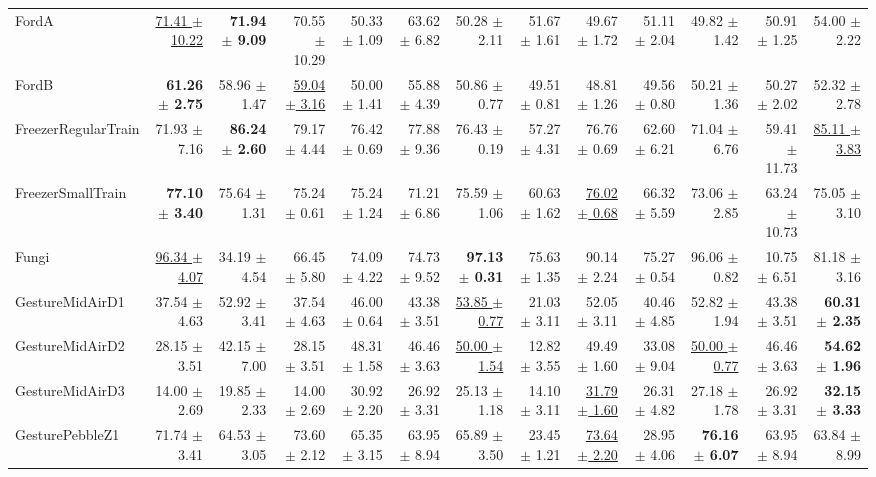 \begin{landscape}
\begin{longtable}{lrrrrrrrrrrrr}
FordA & \underline{71.41 $\pm$ 10.22} & \textbf{71.94 $\pm$ 9.09} & 70.55 $\pm$ 10.29 & 50.33 $\pm$ 1.09 & 63.62 $\pm$ 6.82 & 50.28 $\pm$ 2.11 & 51.67 $\pm$ 1.61 & 49.67 $\pm$ 1.72 & 51.11 $\pm$ 2.04 & 49.82 $\pm$ 1.42 & 50.91 $\pm$ 1.25 & 54.00 $\pm$ 2.22 \\
FordB & \textbf{61.26 $\pm$ 2.75} & 58.96 $\pm$ 1.47 & \underline{59.04 $\pm$ 3.16} & 50.00 $\pm$ 1.41 & 55.88 $\pm$ 4.39 & 50.86 $\pm$ 0.77 & 49.51 $\pm$ 0.81 & 48.81 $\pm$ 1.26 & 49.56 $\pm$ 0.80 & 50.21 $\pm$ 1.36 & 50.27 $\pm$ 2.02 & 52.32 $\pm$ 2.78 \\
FreezerRegularTrain & 71.93 $\pm$ 7.16 & \textbf{86.24 $\pm$ 2.60} & 79.17 $\pm$ 4.44 & 76.42 $\pm$ 0.69 & 77.88 $\pm$ 9.36 & 76.43 $\pm$ 0.19 & 57.27 $\pm$ 4.31 & 76.76 $\pm$ 0.69 & 62.60 $\pm$ 6.21 & 71.04 $\pm$ 6.76 & 59.41 $\pm$ 11.73 & \underline{85.11 $\pm$ 3.83} \\
FreezerSmallTrain & \textbf{77.10 $\pm$ 3.40} & 75.64 $\pm$ 1.31 & 75.24 $\pm$ 0.61 & 75.24 $\pm$ 1.24 & 71.21 $\pm$ 6.86 & 75.59 $\pm$ 1.06 & 60.63 $\pm$ 1.62 & \underline{76.02 $\pm$ 0.68} & 66.32 $\pm$ 5.59 & 73.06 $\pm$ 2.85 & 63.24 $\pm$ 10.73 & 75.05 $\pm$ 3.10 \\
Fungi & \underline{96.34 $\pm$ 4.07} & 34.19 $\pm$ 4.54 & 66.45 $\pm$ 5.80 & 74.09 $\pm$ 4.22 & 74.73 $\pm$ 9.52 & \textbf{97.13 $\pm$ 0.31} & 75.63 $\pm$ 1.35 & 90.14 $\pm$ 2.24 & 75.27 $\pm$ 0.54 & 96.06 $\pm$ 0.82 & 10.75 $\pm$ 6.51 & 81.18 $\pm$ 3.16 \\
GestureMidAirD1 & 37.54 $\pm$ 4.63 & 52.92 $\pm$ 3.41 & 37.54 $\pm$ 4.63 & 46.00 $\pm$ 0.64 & 43.38 $\pm$ 3.51 & \underline{53.85 $\pm$ 0.77} & 21.03 $\pm$ 3.11 & 52.05 $\pm$ 3.11 & 40.46 $\pm$ 4.85 & 52.82 $\pm$ 1.94 & 43.38 $\pm$ 3.51 & \textbf{60.31 $\pm$ 2.35} \\
GestureMidAirD2 & 28.15 $\pm$ 3.51 & 42.15 $\pm$ 7.00 & 28.15 $\pm$ 3.51 & 48.31 $\pm$ 1.58 & 46.46 $\pm$ 3.63 & \underline{50.00 $\pm$ 1.54} & 12.82 $\pm$ 3.55 & 49.49 $\pm$ 1.60 & 33.08 $\pm$ 9.04 & \underline{50.00 $\pm$ 0.77} & 46.46 $\pm$ 3.63 & \textbf{54.62 $\pm$ 1.96} \\
GestureMidAirD3 & 14.00 $\pm$ 2.69 & 19.85 $\pm$ 2.33 & 14.00 $\pm$ 2.69 & 30.92 $\pm$ 2.20 & 26.92 $\pm$ 3.31 & 25.13 $\pm$ 1.18 & 14.10 $\pm$ 3.11 & \underline{31.79 $\pm$ 1.60} & 26.31 $\pm$ 4.82 & 27.18 $\pm$ 1.78 & 26.92 $\pm$ 3.31 & \textbf{32.15 $\pm$ 3.33} \\
GesturePebbleZ1 & 71.74 $\pm$ 3.41 & 64.53 $\pm$ 3.05 & 73.60 $\pm$ 2.12 & 65.35 $\pm$ 3.15 & 63.95 $\pm$ 8.94 & 65.89 $\pm$ 3.50 & 23.45 $\pm$ 1.21 & \underline{73.64 $\pm$ 2.20} & 28.95 $\pm$ 4.06 & \textbf{76.16 $\pm$ 6.07} & 63.95 $\pm$ 8.94 & 63.84 $\pm$ 8.99 \\

\end{longtable}
\end{landscape}
